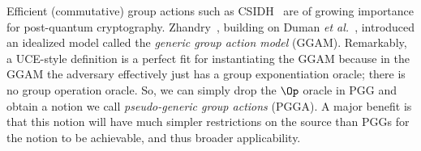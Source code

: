 {\begin{itemize}
 Efficient (commutative) group actions such as CSIDH~\cite{AC:CLMPR18} are of growing importance for post-quantum cryptography.  Zhandry~\cite{ITCS:Zhandry24}, building on Duman \emph{et al.}~\cite{AC:DHKKLR22}, introduced an idealized model called the \emph{generic group action model} (GGAM). %
Remarkably, a UCE-style definition is a perfect fit for instantiating the GGAM  because in the GGAM the adversary effectively just has a group exponentiation oracle; there is no group operation oracle. So, we can simply drop the $\Op$ oracle in PGG and obtain a notion we call \emph{pseudo-generic group actions} (PGGA). A major benefit is that this notion will have much simpler restrictions on the source than PGGs for the notion to be achievable, and thus broader applicability. %



\end{itemize}}
